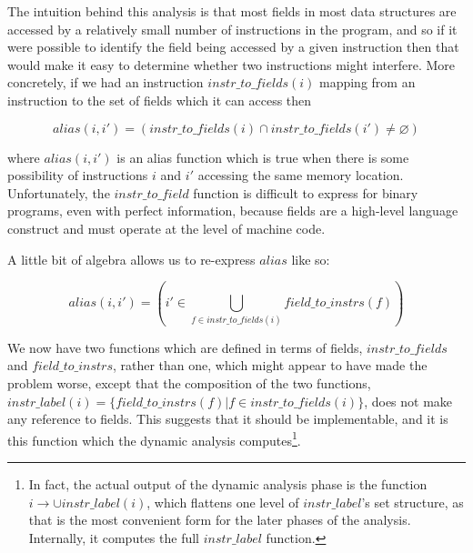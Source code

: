 
The intuition behind this analysis is that most fields in most data
structures are accessed by a relatively small number of instructions
in the program, and so if it were possible to identify the field being
accessed by a given instruction then that would make it easy to
determine whether two instructions might interfere.  More concretely,
if we had an instruction $\mathit{instr\_to\_fields}(i)$ mapping from
an instruction to the set of fields which it can access then

\begin{displaymath}
\mathit{alias}(i, i') = (\mathit{instr\_to\_fields}(i) \cap \mathit{instr\_to\_fields}(i') \not= \varnothing)
\end{displaymath}

where $\mathit{alias}(i, i')$ is an alias function which is true when
there is some possibility of instructions $i$ and $i'$ accessing the
same memory location.  Unfortunately, the $\mathit{instr\_to\_field}$
function is difficult to express for binary programs, even with
perfect information, because fields are a high-level language
construct and {\technique} must operate at the level of machine code.

A little bit of algebra allows us to re-express $\mathit{alias}$ like
so:

\begin{displaymath}
\mathit{alias}(i, i') = \left(i' \in \bigcup_{f \in \mathit{instr\_to\_fields}(i)} \mathit{field\_to\_instrs}(f)\right)
\end{displaymath}

We now have two functions which are defined in terms of fields,
$\mathit{instr\_to\_fields}$ and $\mathit{field\_to\_instrs}$, rather
than one, which might appear to have made the problem worse, except
that the composition of the two functions, $\mathit{instr\_label}(i) =
\{\mathit{field\_to\_instrs}(f) | f \in
\mathit{instr\_to\_fields}(i)\}$, does not make any reference to
fields.  This suggests that it should be implementable, and it is this
function which the dynamic analysis computes\footnote{In fact, the
  actual output of the {\implementation} dynamic analysis phase is the
  function $i \rightarrow \cup \mathit{instr\_label}(i)$, which
  flattens one level of $\mathit{instr\_label}$'s set structure, as
  that is the most convenient form for the later phases of the
  analysis.  Internally, it computes the full $\mathit{instr\_label}$
  function.}.

